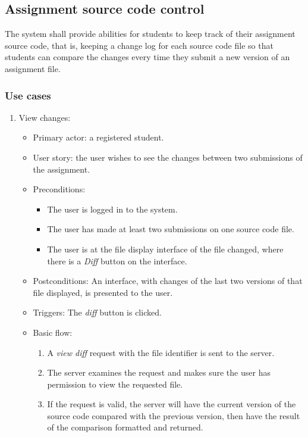 \subsection{Assignment source code control}
The system shall provide abilities for students to keep track of their
assignment source code, that is, keeping a change log for each source code
file so that students can compare the changes every time they submit a new
version of an assignment file.

\subsubsection{Use cases}
\begin{enumerate}
\item View changes:
\begin{itemize}
    \item Primary actor: a registered student.
    \item User story: the user wishes to see the changes between two
        submissions of the assignment.
    \item Preconditions:
        \begin{itemize}
            \item The user is logged in to the system.
            \item The user has made at least two submissions on one source code
                file.
            \item The user is at the file display interface of the file changed,
                where there is a \emph{Diff} button on the interface.
        \end{itemize}
    \item Postconditions:
        An interface, with changes of the last two versions of that file
        displayed, is presented to the user.
    \item Triggers:
        The \emph{diff} button is clicked.
    \item Basic flow:
        \begin{enumerate}
            \item A \emph{view diff} request with the file identifier is sent
                to the server.
            \item The server examines the request and makes sure the user has
                permission to view the requested file.
            \item If the request is valid, the server will have the current
                version of the source code compared with the previous version,
                then have the result of the comparison formatted and
                returned.
        \end{enumerate}
\end{itemize}
\end{enumerate}

